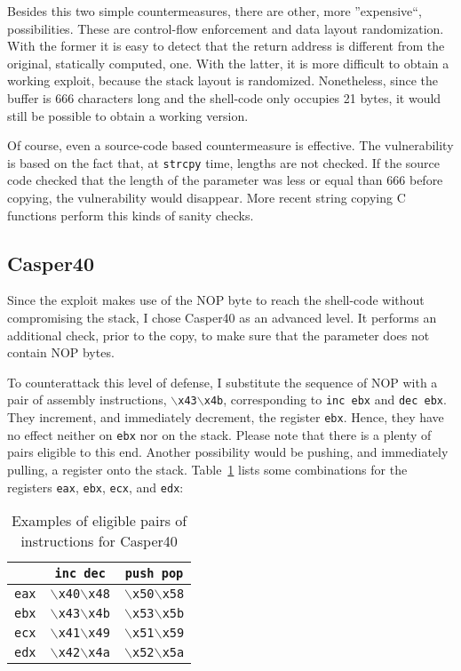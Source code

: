 Besides this two simple countermeasures, there are other, more ''expensive``, possibilities. These are control-flow enforcement and data layout randomization. With the former it is easy to detect that the return address is different from the original, statically computed, one. With the latter, it is more difficult to obtain a working exploit, because the stack layout is randomized. Nonetheless, since the buffer is 666 characters long and the shell-code only occupies 21 bytes, it would still be possible to obtain a working version.

Of course, even a source-code based countermeasure is effective. The vulnerability is based on the fact that, at \texttt{strcpy} time, lengths are not checked. If the source code checked that the length of the parameter was less or equal than 666 before copying, the vulnerability would disappear. More recent string copying C functions perform this kinds of sanity checks.

\subsection{Casper40}\label{sec:casper40}
Since the exploit makes use of the NOP byte to reach the shell-code without compromising the stack, I chose Casper40 as an advanced level. It performs an additional check, prior to the copy, to make sure that the parameter does not contain NOP bytes. 

To counterattack this level of defense, I substitute the sequence of NOP with a pair of assembly instructions, \texttt{$\backslash$x43$\backslash$x4b}, corresponding to \texttt{inc ebx} and \texttt{dec ebx}. They increment, and immediately decrement, the register \texttt{ebx}. Hence, they have no effect neither on \texttt{ebx} nor on the stack. Please note that there is a plenty of pairs eligible to this end. Another possibility would be pushing, and immediately pulling, a register onto the stack. Table~\ref{tbl:casper40} lists some combinations for the registers \texttt{eax}, \texttt{ebx}, \texttt{ecx}, and \texttt{edx}:
\begin{table}[h]
	\centering
	\begin{tabular}{|c|c|c|}
		\hline
		& \texttt{inc dec}                        & \texttt{push pop}                       \\ \hline
		\texttt{eax} & \texttt{$\backslash$x40$\backslash$x48} & \texttt{$\backslash$x50$\backslash$x58} \\ \hline
		\texttt{ebx} & \texttt{$\backslash$x43$\backslash$x4b} & \texttt{$\backslash$x53$\backslash$x5b} \\ \hline
		\texttt{ecx} & \texttt{$\backslash$x41$\backslash$x49} & \texttt{$\backslash$x51$\backslash$x59} \\ \hline
		\texttt{edx} & \texttt{$\backslash$x42$\backslash$x4a} & \texttt{$\backslash$x52$\backslash$x5a} \\ \hline
	\end{tabular}
	\caption{Examples of eligible pairs of instructions for Casper40}
	\label{tbl:casper40}
\end{table}

